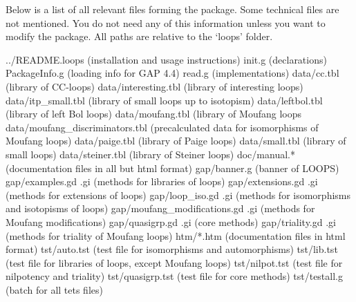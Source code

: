 
Below is a list of all relevant files forming the {\LOOPS} package. Some
technical files are not mentioned. You do not need any of this information
unless you want to modify the package. All paths are relative to the
`loops' folder.

\begintt
../README.loops (installation and usage instructions)
init.g (declarations)
PackageInfo.g (loading info for GAP 4.4)
read.g (implementations)
data/cc.tbl (library of CC-loops)
data/interesting.tbl (library of interesting loops)
data/itp_small.tbl (library of small loops up to isotopism)
data/leftbol.tbl (library of left Bol loops)
data/moufang.tbl (library of Moufang loops
data/moufang_discriminators.tbl (precalculated data for isomorphisms of Moufang loops)
data/paige.tbl (library of Paige loops)
data/small.tbl (library of small loops)
data/steiner.tbl (library of Steiner loops)
doc/manual.* (documentation files in all but html format)
gap/banner.g (banner of LOOPS)
gap/examples.gd .gi (methods for libraries of loops)
gap/extensions.gd .gi (methods for extensions of loops)
gap/loop_iso.gd .gi (methods for isomorphisms and isotopisms of loops)
gap/moufang_modifications.gd .gi (methods for Moufang modifications)
gap/quasigrp.gd .gi (core methods)
gap/triality.gd .gi (methods for triality of Moufang loops)
htm/*.htm (documentation files in html format)
tst/auto.tst (test file for isomorphisms and automorphisms)
tst/lib.tst (test file for libraries of loops, except Moufang loops)
tst/nilpot.tst (test file for nilpotency and triality)
tst/quasigrp.tst (test file for core methods)
tst/testall.g (batch for all tets files)
\endtt
